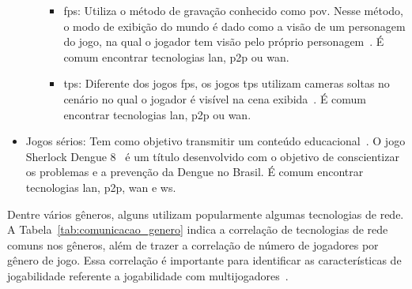 \begin{itemize}
\begin{itemize}
        \begin{itemize}
          \item \ac{fps}: Utiliza o método de gravação conhecido como \ac{pov}. Nesse método, o modo de exibição do mundo é dado como a visão de um personagem do jogo, na qual o jogador tem visão pelo próprio personagem~\cite{video_game_technologies, adams_1208533}. É comum encontrar tecnologias \ac{lan}, \ac{p2p} ou \ac{wan}.
          \item \ac{tps}: Diferente dos jogos \ac{fps}, os jogos \ac{tps} utilizam cameras soltas no cenário no qual o jogador é visível na cena exibida~\cite{video_game_technologies, adams_1208533}. É comum encontrar tecnologias \ac{lan}, \ac{p2p} ou \ac{wan}.
        \end{itemize}
    \end{itemize}
  \item Jogos sérios: Tem como objetivo transmitir um conteúdo educacional~\cite{video_game_technologies}. O jogo Sherlock Dengue 8~\cite{sherlock_dengue} é um título desenvolvido com o objetivo de conscientizar os problemas e a prevenção da Dengue no Brasil. É comum encontrar tecnologias \ac{lan}, \ac{p2p}, \ac{wan} e \ac{ws}.
\end{itemize}



Dentre vários gêneros, alguns utilizam popularmente algumas tecnologias de rede.
%
A Tabela~\ref{tab:comunicacao_genero} indica a correlação de tecnologias de rede comuns nos gêneros, além de trazer a correlação de número de jogadores por gênero de jogo.
%
Essa correlação é importante para identificar as características de jogabilidade referente a jogabilidade com multijogadores~\cite{video_game_technologies}.



